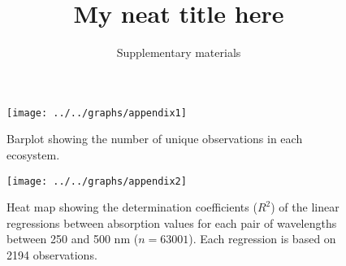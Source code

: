 \documentclass[10pt,a4paper]{scrartcl}
\title{My neat title here}
\subtitle{Supplementary materials}
\date{}
\begin{document}
\maketitle

\begin{figure}[h]
	\centering
	\texttt{[image: ../../graphs/appendix1]}
	\caption{Barplot showing the number of unique observations in each ecosystem.}
\end{figure}

\clearpage
\newpage

\begin{figure}[h]
	\centering
	\texttt{[image: ../../graphs/appendix2]}
	\caption{Heat map showing the determination coefficients ($R^2$) of the linear regressions between absorption values for each pair of wavelengths between 250 and 500 nm ($n = 63001$). Each regression is based on 2194 observations.}
\end{figure}
\end{document}

